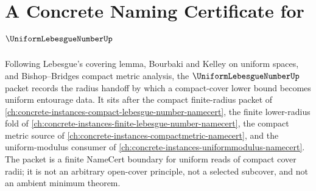 \chapter{A Concrete Naming Certificate for $\UniformLebesgueNumberUp$}
\label{ch:concrete-instances-uniform-lebesgue-number-namecert}

Following Lebesgue's covering lemma, Bourbaki and Kelley on uniform spaces, and Bishop--Bridges compact metric analysis, the $\UniformLebesgueNumberUp$ packet records the radius handoff by which a compact-cover lower bound becomes uniform entourage data. It sits after the compact finite-radius packet of \autoref{ch:concrete-instances-compact-lebesgue-number-namecert}, the finite lower-radius fold of \autoref{ch:concrete-instances-finite-lebesgue-number-namecert}, the compact metric source of \autoref{ch:concrete-instances-compactmetric-namecert}, and the uniform-modulus consumer of \autoref{ch:concrete-instances-uniformmodulus-namecert}. The packet is a finite NameCert boundary for uniform reads of compact cover radii; it is not an arbitrary open-cover principle, not a selected subcover, and not an ambient minimum theorem.

